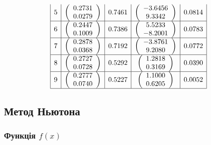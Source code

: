 \documentclass[14pt,a4paper]{extarticle}
\theoremstyle{definition}
\renewcommand{\[}{\begin{dmath*}[compact]}
\renewcommand{\]}{\end{dmath*}}
\begin{document}
\[\begin{array}{*5{|c}|}
   5 & \left(\begin{array}{c}    0.2731\\    0.0279\end{array}\right) &     0.7461 & \left(\begin{array}{c}   -3.6456\\    9.3342\end{array}\right) &     0.0814 \\\hline
   6 & \left(\begin{array}{c}    0.2447\\    0.1009\end{array}\right) &     0.7386 & \left(\begin{array}{c}    5.5233\\   -8.2001\end{array}\right) &     0.0783 \\\hline
   7 & \left(\begin{array}{c}    0.2878\\    0.0368\end{array}\right) &     0.7192 & \left(\begin{array}{c}   -3.8761\\    9.2080\end{array}\right) &     0.0772 \\\hline
   8 & \left(\begin{array}{c}    0.2727\\    0.0728\end{array}\right) &     0.5292 & \left(\begin{array}{c}    1.2818\\    0.3169\end{array}\right) &     0.0390 \\\hline
   9 & \left(\begin{array}{c}    0.2777\\    0.0740\end{array}\right) &     0.5227 & \left(\begin{array}{c}    1.1000\\    0.6205\end{array}\right) &     0.0052 \\\hline
\end{array}\]

\subsection{Метод Ньютона}

\subsubsection{Функція $f(x)$}
\end{document}
